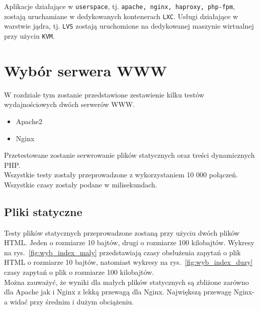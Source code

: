 Aplikacje działające w \texttt{userspace}, tj. \texttt{apache, nginx, haproxy, php-fpm}, zostają uruchamiane w dedykowanych kontenerach \texttt{LXC}.
Usługi działające w warstwie jądra, tj. \texttt{LVS} zostają uruchomione na dedykowanej maszynie wirtualnej przy użyciu \texttt{KVM}.
\section{Wybór serwera WWW}
\label{sec:wybor}
W rozdziale tym zostanie przedstawione zestawienie kilku testów wydajnościowych dwóch serwerów WWW\@.
\begin{itemize}
\item Apache2
\item Nginx
\end{itemize}
Przetestowane zostanie serwrowanie plików statycznych oraz treści dynamicznych PHP{.}\\
Wszystkie testy zostały przeprowadzone z wykorzystaniem 10 000 połączeń.\\
Wszystkie czasy zostały podane w milisekundach.
\subsection{Pliki statyczne}
Testy plików statycznych przeprowadzone zostaną przy użyciu dwóch plików HTML{.}
Jeden o rozmiarze 10 bajtów, drugi o rozmiarze 100 kilobajtów.
Wykresy na rys.~\ref{fig:wyb_index_maly} przedstawiają czasy obsłużenia zapytań o plik HTML o rozmiarze 10 bajtów, natomiast wykresy na rys.~\ref{fig:wyb_index_duzy} czasy zapytań o plik o rozmiarze 100 kilobajtów.\\
Można zauważyć, że wyniki dla małych plików statycznych są zbliżone zarówno dla Apache jak i Nginx z lekką przewagą dla Nginx.
Największą przewagę Nginx-a widać przy średnim i dużym obciążeniu.
